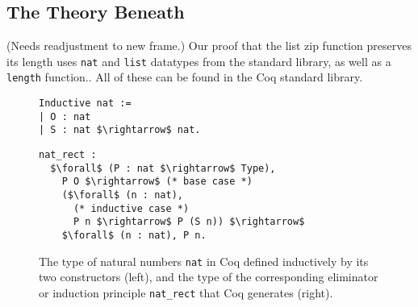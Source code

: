 \subsection{The Theory Beneath}
\label{sec:mot-theory}

\iffalse
\begin{figure}
\begin{lstlisting}
zip {T$_1$} {T$_2$} (l$_1$ : list T$_1$) (l$_2$ : list T$_2$) : list (T$_1$ * T$_2$) :=
  list_rect (fun _ : list T$_1$ => list T$_2$ $\rightarrow$ list (T$_1$ * T$_2$))
    (fun _ => nil)
    (fun t$_1$ tl$_1$ (zip_tl$_1$ : list T$_2$ $\rightarrow$ list (T$_1$ * T$_2$)) l$_2$ =>
      list_rect (fun _ : list T$_2$ => list (T$_1$ * T$_2$))
        nil
        (fun t$_2$ tl$_2$ (_ : list (T$_1$ * T$_2$)) =>
          cons (t$_1$, t$_2$) (zip_tl$_1$ tl$_2$))
        l$_2$)
    l$_1$
    l$_2$.
\end{lstlisting}
\caption{The list \lstinline{zip} function, taken from an existing tool~\cite{TODO} %
and translated to use eliminators.}
\label{fig:zip}
\end{figure}
\fi %

(Needs readjustment to new frame.)
Our proof that the list zip function preserves its length uses \lstinline{nat} and \lstinline{list}
datatypes from the standard library, as well as a \lstinline{length} function..
All of these can be found in the Coq standard library.

\begin{figure}
\begin{minipage}{0.30\textwidth}
\begin{lstlisting}
Inductive nat :=
| O : nat
| S : nat $\rightarrow$ nat.
\end{lstlisting}
\end{minipage}
\hfill
\begin{minipage}{0.68\textwidth}
\begin{lstlisting}
nat_rect :
  $\forall$ (P : nat $\rightarrow$ Type),
    P O $\rightarrow$ (* base case *)
    ($\forall$ (n : nat),
      (* inductive case *)
      P n $\rightarrow$ P (S n)) $\rightarrow$
    $\forall$ (n : nat), P n.
\end{lstlisting}
\end{minipage}
\caption{The type of natural numbers \lstinline{nat} in Coq defined inductively by its two constructors (left), and the type of the corresponding eliminator or induction principle \lstinline{nat_rect} that Coq generates (right).}
\label{fig:nat}
\end{figure}

